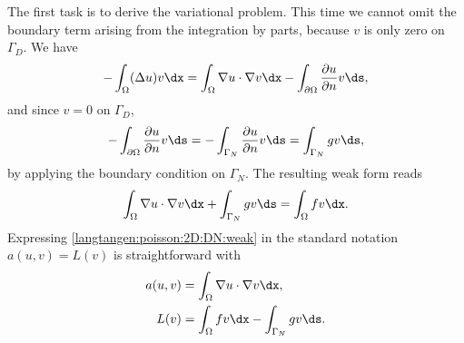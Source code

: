 The first task is to derive the variational problem. This time we cannot
omit the boundary term arising from the integration by parts, because $v$
is only zero on $\Gamma_D$. We have
\begin{equation}
 -\int_\Omega (\Delta u)v \dx
= \int_\Omega\nabla u\cdot\nabla v\dx
  - \int_{\partial\Omega} \frac{\partial u}{\partial n}v\ds,
\end{equation}
and since $v=0$ on $\Gamma_D$,
\begin{equation}
- \int_{\partial\Omega} \frac{\partial u}{\partial n}v\ds
=
- \int_{\Gamma_N} \frac{\partial u}{\partial n}v\ds
= \int_{\Gamma_N}gv\ds,
\end{equation}
by applying the boundary condition on $\Gamma_N$.  The resulting weak
form reads
\begin{equation}
\int_{\Omega} \nabla u \cdot \nabla v \dx +
\int_{\Gamma_N} gv\ds
= \int_{\Omega} fv \dx.
\label{langtangen:poisson:2D:DN:weak}
\end{equation}
Expressing \eqref{langtangen:poisson:2D:DN:weak} in the standard notation
$a(u,v)=L(v)$ is straightforward with
\begin{align}
  a(u, v) &= \int_{\Omega} \nabla u \cdot \nabla v \dx,
  \label{langtangen:poisson2:vard:a}
\\
  L(v) &= \int_{\Omega} fv \dx - \int_{\Gamma_N} gv\ds.
  \label{langtangen:poisson2:vard:L}
\end{align}

